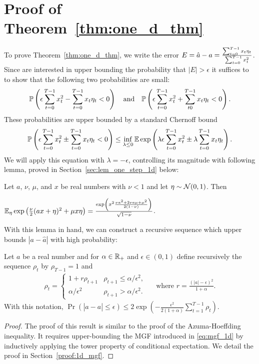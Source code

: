 \section{Proof of Theorem~\ref{thm:one_d_thm}\label{sec:proof_one_d}}
To prove Theorem~\ref{thm:one_d_thm}, we write the error $E = \hat a - a = \frac{\sum_{t = 0}^{T - 1}x_t \eta_{t}}{\sum_{t = 0}^{T - 1}x_t^2}$. Since are interested in upper bounding the probability that $|E| > \epsilon$  it suffices to to show that the following two probabilities are small:
\begin{align*}
\mathbb{P}\left(\epsilon \sum_{t = 0}^{T - 1} x_t^2 - \sum_{t = 0}^{T - 1} x_t \eta_t < 0\right) \quad \text{and} \quad \mathbb{P}\left(\epsilon \sum_{t = 0}^{T - 1} x_t^2 + \sum_{t 0}^{T - 1} x_t \eta_t < 0\right).
\end{align*}
These probabilities are upper bounded by a standard Chernoff bound
\begin{align}
\label{eq:mgf_1d}
\mathbb{P}\left(\epsilon \sum_{t = 0}^{T - 1} x_t^2 \pm \sum_{t = 0}^{T - 1} x_t \eta_t < 0\right) \leq \inf_{\lambda \leq 0}\mathbb{E} \exp\left(\lambda \epsilon \sum_{t = 0}^{T - 1} x_t^2 \pm \lambda \sum_{t = 0}^{T - 1} x_t \eta_t\right).
\end{align}
We will apply this equation with $\lambda = -\epsilon$, controlling its magnitude with following lemma, proved in Section~\ref{sec:lem_one_step_1d} below:
\begin{lemma}
\label{lem:one_step_1d_mgf}
Let $a$, $\nu$, $\mu$, and $x$ be real numbers with $\nu < 1$ and let $\eta \sim \mathcal{N}(0, 1)$. Then

$\mathbb{E}_\eta \exp \left(\frac{\nu}{2} (ax + \eta)^2 + \mu x \eta\right) = \frac{\exp\left(x^2\frac{\nu a^2 + 2\nu a \mu + \mu^2}{2(1- \nu)}\right)}{\sqrt{1 - \nu}}$.
\end{lemma}
With this lemma in hand, we can construct a recursive sequence which upper bounds $|a-\widehat{a}|$ with high probability:
\begin{prop}\label{prop:1d_mgf_bound}
Let $a$ be a real number and for $\alpha \in \mathbb{R}_{+}$ and $\epsilon \in (0,1)$ define recursively the sequence $\rho_t$ by $\rho_{T - 1} = 1$ and
\begin{align*}
\rho_{t} =
\begin{cases}
1 + r\rho_{t+ 1} & \rho_{t + 1} \leq \alpha/\epsilon^2,\\
\alpha/\epsilon^2 & \rho_{t + 1} > \alpha / \epsilon^2.
\end{cases}
\quad \text{ where } r = \frac{(|a| - \epsilon)^2}{1 + \alpha}.
\end{align*}
With this notation, $\Pr\left(|\widehat a - a| \leq \epsilon \right) \leq 2\exp \left(-\frac{\epsilon^2}{2(1 + \alpha)}\sum_{t = 1}^{T - 1}\rho_t\right).$
\end{prop}
\begin{proof}
The proof of this result is similar to the proof of the Azuma-Hoeffding inequality. It requires upper-bounding the MGF introduced in \eqref{eq:mgf_1d} by inductively applying the tower property of conditional expectation. We detail the proof in Section~\ref{proof:1d_mgf}.
\end{proof}


